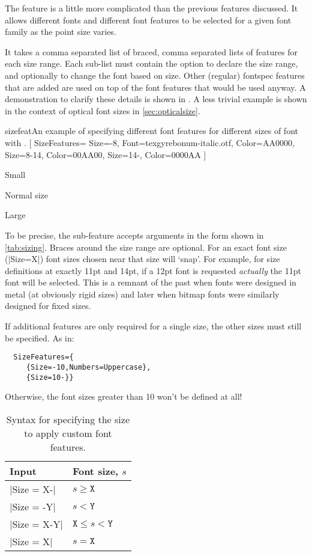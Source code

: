 \documentclass[a4paper]{l3doc}
\begin{document}
The  feature is a little more complicated
than the previous features discussed. It allows different fonts
and different font features to be selected for a given font
family as the point size varies.

It takes a comma separated list of braced, comma separated lists of features for each size range.
Each sub-list must contain the  option
to declare the size range, and optionally  to change the
font based on size. Other (regular) fontspec features that are added
are used on top of the font features that would be used anyway.
A demonstration to clarify these details is shown in .
A less trivial example is shown in the context of optical font sizes
in \vref{sec:opticalsize}.

\begin{Xexample}{sizefeat}{An example of specifying different font features for different sizes of font with .}
  [
    SizeFeatures={
      {Size={-8}, Font=texgyrebonum-italic.otf, Color=AA0000},
      {Size={8-14}, Color=00AA00},
      {Size={14-}, Color=0000AA}} ]

  {\scriptsize Small\par} Normal size\par {\Large Large\par}
\end{Xexample}

To be precise, the  sub-feature accepts arguments in the form shown in \vref{tab:sizing}.
Braces around the size range are optional. For an exact font size (|Size=X|)
font sizes chosen near that size will `snap'. For example, for size definitions
at exactly 11pt and 14pt, if a 12pt font is requested \emph{actually} the
11pt font will be selected. This is a remnant of the past when fonts were designed
in metal (at obviously rigid sizes) and later when bitmap fonts were similarly
designed for fixed sizes.

If additional features are only required for a single size, the other sizes
must still be specified.  As in:
\begin{Verbatim}
  SizeFeatures={
     {Size=-10,Numbers=Uppercase},
     {Size=10-}}
\end{Verbatim}
Otherwise, the font sizes greater than 10 won't be defined at all!

\begin{table}
\caption{Syntax for specifying the size to apply custom font features.}\label{tab:sizing}
\centering
\begin{tabular}{@{}ll@{}}
\toprule
Input & Font size, $s$ \\
\midrule
 |Size = X-| & $s \geq \texttt{X}$ \\
 |Size = -Y| & $s < \texttt{Y}$ \\
 |Size = X-Y| & $\texttt{X} \leq s < \texttt{Y}$ \\
 |Size = X| & $s = \texttt{X}$ \\
\bottomrule
\end{tabular}
\end{table}
\end{document}
